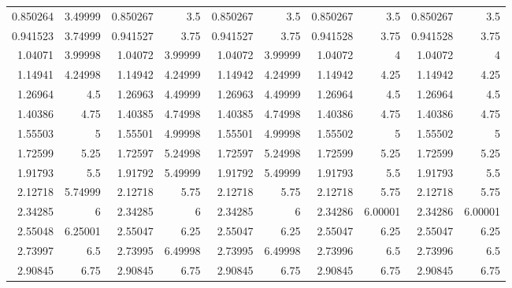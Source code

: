 \documentclass[10pt,letterpaper]{article}
\begin{document}
\begin{figure}
\begin{tabular}{rrrrrrrrrr}
 0.850264  &  3.49999  &    0.850267  &     3.5      &        0.850267  &         3.5      & 0.850267  &  3.5     &    0.850267  &      3.5     \\
 0.941523  &  3.74999  &    0.941527  &     3.75     &        0.941527  &         3.75     & 0.941528  &  3.75    &    0.941528  &      3.75    \\
 1.04071   &  3.99998  &    1.04072   &     3.99999  &        1.04072   &         3.99999  & 1.04072   &  4       &    1.04072   &      4       \\
 1.14941   &  4.24998  &    1.14942   &     4.24999  &        1.14942   &         4.24999  & 1.14942   &  4.25    &    1.14942   &      4.25    \\
 1.26964   &  4.5      &    1.26963   &     4.49999  &        1.26963   &         4.49999  & 1.26964   &  4.5     &    1.26964   &      4.5     \\
 1.40386   &  4.75     &    1.40385   &     4.74998  &        1.40385   &         4.74998  & 1.40386   &  4.75    &    1.40386   &      4.75    \\
 1.55503   &  5        &    1.55501   &     4.99998  &        1.55501   &         4.99998  & 1.55502   &  5       &    1.55502   &      5       \\
 1.72599   &  5.25     &    1.72597   &     5.24998  &        1.72597   &         5.24998  & 1.72599   &  5.25    &    1.72599   &      5.25    \\
 1.91793   &  5.5      &    1.91792   &     5.49999  &        1.91792   &         5.49999  & 1.91793   &  5.5     &    1.91793   &      5.5     \\
 2.12718   &  5.74999  &    2.12718   &     5.75     &        2.12718   &         5.75     & 2.12718   &  5.75    &    2.12718   &      5.75    \\
 2.34285   &  6        &    2.34285   &     6        &        2.34285   &         6        & 2.34286   &  6.00001 &    2.34286   &      6.00001 \\
 2.55048   &  6.25001  &    2.55047   &     6.25     &        2.55047   &         6.25     & 2.55047   &  6.25    &    2.55047   &      6.25    \\
 2.73997   &  6.5      &    2.73995   &     6.49998  &        2.73995   &         6.49998  & 2.73996   &  6.5     &    2.73996   &      6.5     \\
 2.90845   &  6.75     &    2.90845   &     6.75     &        2.90845   &         6.75     & 2.90845   &  6.75    &    2.90845   &      6.75    \\

\end{tabular}
\end{figure}
\end{document}
